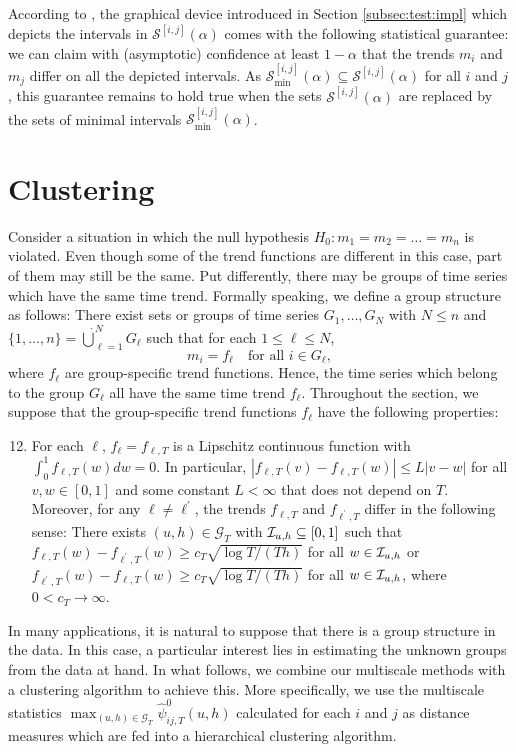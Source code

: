 \documentclass[12pt]{article}
\makeatletter
\renewcommand{\eqref}[1]{\tagform@{\ref{#1}}}
\makeatother
\begin{document}
\begin{remark}
According to \eqref{eq:CS-v2}, the graphical device introduced in Section \ref{subsec:test:impl} which depicts the intervals in $\mathcal{S}^{[i, j]}(\alpha)$ comes with the following statistical guarantee: we can claim with (asymptotic) confidence at least $1-\alpha$ that the trends $m_i$ and $m_j$ differ on all the depicted intervals. As $\mathcal{S}^{[i, j]}_{\text{min}}(\alpha) \subseteq \mathcal{S}^{[i, j]}(\alpha)$ for all $i$ and $j$, this guarantee remains to hold true when the sets $\mathcal{S}^{[i, j]}(\alpha)$ are replaced by the sets of minimal intervals $\mathcal{S}_{\text{min}}^{[i, j]}(\alpha)$.
\end{remark}



\section{Clustering}\label{sec:clustering}


Consider a situation in which the null hypothesis $H_0: m_1 = m_2 = \ldots = m_n$ is violated. Even though some of the trend functions are different in this case, part of them may still be the same. Put differently, there may be groups of time series which have the same time trend. Formally speaking, we define a group structure as follows: There exist sets or groups of time series $G_1,\ldots, G_N$ with $N \le n$ and $\{1,\ldots, n\} = \mathbin{\dot{\bigcup}}_{\ell=1}^{N} G_\ell$ such that for each $1 \le \ell \le N$,
\[ m_i = f_\ell \quad \text{for all } i \in G_\ell, \]
where $f_\ell$ are group-specific trend functions. Hence, the time series which belong to the group $G_\ell$ all have the same time trend $f_\ell$. Throughout the section, we suppose that the group-specific trend functions $f_\ell$ have the following properties: 
\begin{enumerate}[label=(C\arabic*),leftmargin=1.2cm]
\setcounter{enumi}{11}
\item \label{C-clustering} For each $\ell$, $f_\ell = f_{\ell,T}$ is a Lipschitz continuous function with $\int_0^1 f_{\ell,T}(w) dw = 0$. In particular, $|f_{\ell,T}(v) - f_{\ell,T}(w)| \le L |v-w|$ for all $v, w \in [0,1]$ and some constant $L < \infty$ that does not depend on $T$. Moreover, for any $\ell \ne \ell^\prime$, the trends $f_{\ell,T}$ and $f_{\ell^\prime,T}$ differ in the following sense: There exists $(u, h) \in \mathcal{G}_T$ with $\mathcal{I}_{u, h} \subseteq [0,1]$ such that $f_{\ell,T}(w) - f_{\ell^\prime,T}(w) \ge c_T \sqrt{\log T/(Th)}$ for all $w \in \mathcal{I}_{u, h}$ or $f_{\ell^\prime,T}(w) - f_{\ell,T}(w) \ge c_T \sqrt{\log T/(Th)}$ for all $w \in \mathcal{I}_{u, h}$, where $0 < c_T \rightarrow \infty$.
\end{enumerate}
In many applications, it is natural to suppose that there is a group structure in the data. In this case, a particular interest lies in estimating the unknown groups from the data at hand. In what follows, we combine our multiscale methods with a clustering algorithm to achieve this. More specifically, we use the multiscale statistics $\max_{(u, h) \in \mathcal{G}_T}\hat{\psi}^0_{ij, T}(u, h)$ calculated for each $i$ and $j$ as distance measures which are fed into a hierarchical clustering algorithm. 
\end{document}
